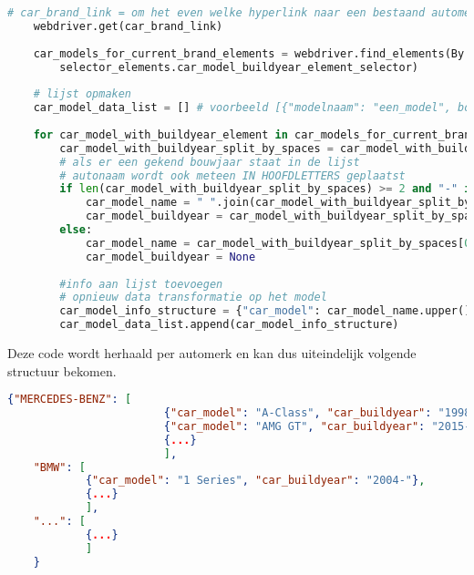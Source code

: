 \begin{lstlisting}[language=Python, caption=Selenium Webdriver vindt automodellen en hun bouwjaar, breaklines=true, showstringspaces=false]
	# car_brand_link = om het even welke hyperlink naar een bestaand automerk waar de modellen zichtbaar zijn
	webdriver.get(car_brand_link)
	
	car_models_for_current_brand_elements = webdriver.find_elements(By.XPATH,
		selector_elements.car_model_buildyear_element_selector)
	
	# lijst opmaken
	car_model_data_list = [] # voorbeeld [{"modelnaam": "een_model", bouwjaar: "2000-2010"}, ...]}
	
	for car_model_with_buildyear_element in car_models_for_current_brand_elements:
		car_model_with_buildyear_split_by_spaces = car_model_with_buildyear_element.text.split(" ") # bijvoorbeeld ["A-Class", "1988-"]
		# als er een gekend bouwjaar staat in de lijst
		# autonaam wordt ook meteen IN HOOFDLETTERS geplaatst
		if len(car_model_with_buildyear_split_by_spaces) >= 2 and "-" in car_model_with_buildyear_split_by_spaces[-1]:
			car_model_name = " ".join(car_model_with_buildyear_split_by_spaces[:-1]).upper()
			car_model_buildyear = car_model_with_buildyear_split_by_spaces[-1]
		else:
			car_model_name = car_model_with_buildyear_split_by_spaces[0]
			car_model_buildyear = None
		
		#info aan lijst toevoegen
		# opnieuw data transformatie op het model
		car_model_info_structure = {"car_model": car_model_name.upper(), "car_buildyear": car_model_buildyear}
		car_model_data_list.append(car_model_info_structure)
\end{lstlisting}
Deze code wordt herhaald per automerk en kan dus uiteindelijk volgende structuur bekomen.
\begin{lstlisting}[language=json, caption=Eindresultaat formaat auto catalogus, label={formaat-auto-catalogus}, breaklines=true, showstringspaces=false]
	{"MERCEDES-BENZ": [
						{"car_model": "A-Class", "car_buildyear": "1998-"},
						{"car_model": "AMG GT", "car_buildyear": "2015-"},
						{...}
						],
	"BMW": [
			{"car_model": "1 Series", "car_buildyear": "2004-"},
			{...}
			],
	"...": [
			{...}
			]
	}
\end{lstlisting}

